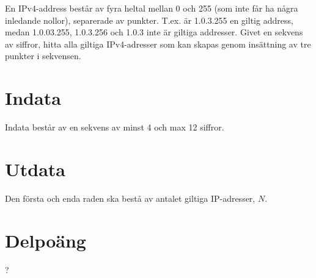 En IPv4-address består av fyra heltal mellan 0 och 255 (som inte får ha några inledande nollor), separerade av punkter. T.ex. är 1.0.3.255 en giltig address, medan 1.0.03.255, 1.0.3.256 och 1.0.3 inte är giltiga addresser.
Givet en sekvens av siffror, hitta alla giltiga IPv4-adresser som kan skapas genom insättning av tre punkter i sekvensen.

\section*{Indata}
Indata består av en sekvens av minst 4 och max 12 siffror.

\section*{Utdata}
Den första och enda raden ska bestå av antalet giltiga IP-adresser, $N$.

\section*{Delpoäng}
?
